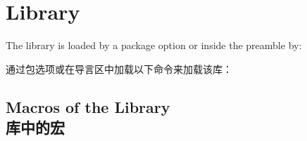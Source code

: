 %  
\section{Library }\label{sec:fitting}%
%
The library is loaded by a package option or inside the preamble by:

通过包选项或在导言区中加载以下命令来加载该库：
\begin{dispListing}
\end{dispListing}

\subsection{Macros of the Library\\库中的宏}

